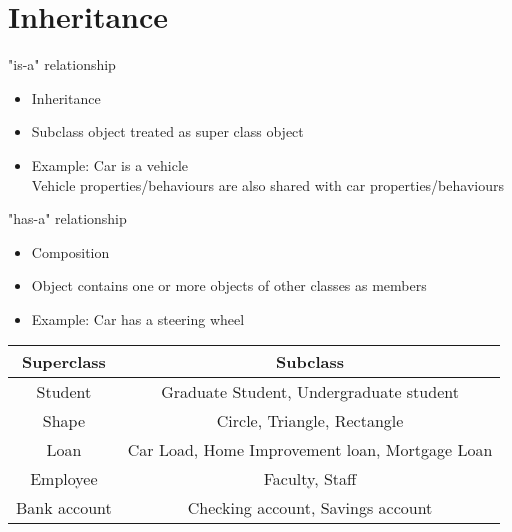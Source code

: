 \documentclass{article}
\begin{document}
\section{Inheritance}
"is-a" relationship
\begin{itemize}
	\item Inheritance
	\item Subclass object treated as super class object
	\item Example: Car is a vehicle\\Vehicle properties/behaviours are also shared with car properties/behaviours
\end{itemize}
"has-a" relationship
\begin{itemize}
	\item Composition
	\item Object contains one or more objects of other classes as members
	\item Example: Car has a steering wheel
\end{itemize}
\begin{center}
 \begin{tabular}{||c c||}
 \hline
 Superclass & Subclass \\ [0.5ex]
 \hline \hline
 Student & Graduate Student, Undergraduate student \\
 \hline
 Shape & Circle, Triangle, Rectangle\\
 \hline
 Loan & Car Load, Home Improvement loan, Mortgage Loan \\
 \hline
 Employee & Faculty, Staff \\
 \hline
 Bank account & Checking account, Savings account
 \hline
 
 \end{tabular}
\end{center}
\end{document}
